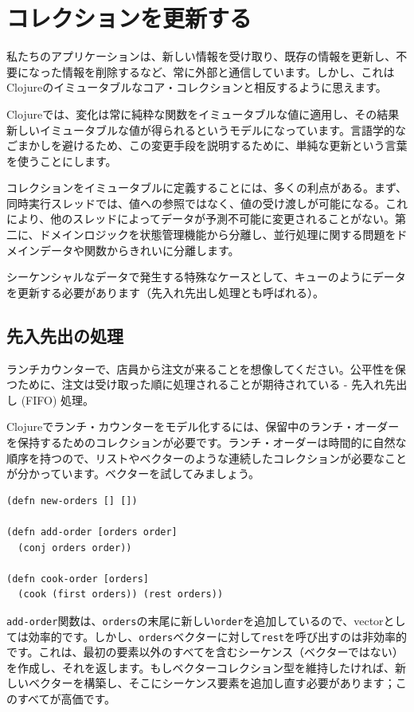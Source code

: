 \section{コレクションを更新する}

私たちのアプリケーションは、新しい情報を受け取り、既存の情報を更新し、不要になった情報を削除するなど、常に外部と通信しています。しかし、これはClojureのイミュータブルなコア・コレクションと相反するように思えます。

Clojureでは、変化は常に純粋な関数をイミュータブルな値に適用し、その結果新しいイミュータブルな値が得られるというモデルになっています。言語学的なごまかしを避けるため、この変更手段を説明するために、単純な更新という言葉を使うことにします。

コレクションをイミュータブルに定義することには、多くの利点がある。まず、同時実行スレッドでは、値への参照ではなく、値の受け渡しが可能になる。これにより、他のスレッドによってデータが予測不可能に変更されることがない。第二に、ドメインロジックを状態管理機能から分離し、並行処理に関する問題をドメインデータや関数からきれいに分離します。

シーケンシャルなデータで発生する特殊なケースとして、キューのようにデータを更新する必要があります（先入れ先出し処理とも呼ばれる）。

\subsection{先入先出の処理}

ランチカウンターで、店員から注文が来ることを想像してください。公平性を保つために、注文は受け取った順に処理されることが期待されている - 先入れ先出し (FIFO) 処理。

Clojureでランチ・カウンターをモデル化するには、保留中のランチ・オーダーを保持するためのコレクションが必要です。ランチ・オーダーは時間的に自然な順序を持つので、リストやベクターのような連続したコレクションが必要なことが分かっています。ベクターを試してみましょう。

\begin{lstlisting}[numbers=none]
(defn new-orders [] [])

(defn add-order [orders order]
  (conj orders order))

(defn cook-order [orders]
  (cook (first orders)) (rest orders))
\end{lstlisting}

\texttt{add-order}関数は、\texttt{orders}の末尾に新しい\texttt{order}を追加しているので、vectorとしては効率的です。しかし、\texttt{orders}ベクターに対して\texttt{rest}を呼び出すのは非効率的です。これは、最初の要素以外のすべてを含むシーケンス（ベクターではない）を作成し、それを返します。もしベクターコレクション型を維持したければ、新しいベクターを構築し、そこにシーケンス要素を追加し直す必要があります；このすべてが高価です。

